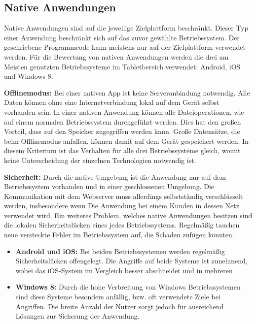 \subsection{Native Anwendungen}
Native Anwendungen sind auf die jeweilige Zielplattform beschränkt. Dieser Typ einer Anwendung beschränkt sich auf das zuvor gewählte Betriebssystem. Der geschriebene Programmcode kann meistens nur auf der Zielplattform verwendet werden. Für die Bewertung von nativen Anwendungen werden die drei am Meisten genutzten Betriebssysteme im Tabletbereich verwendet: Android, iOS und Windows 8\cite{bib:nativeBS}. \par

\textbf{Offlinemodus:} Bei einer nativen App ist keine Serveranbindung notwendig. Alle Daten können ohne eine Internetverbindung lokal auf dem Gerät selbst vorhanden sein. In einer nativen Anwendung können alle Dateioperationen, wie auf einem normalen Betriebssystem durchgeführt werden. Dies hat den großen Vorteil, dass auf den Speicher zugegriffen werden kann. Große Datensätze, die beim Offlinemodus anfallen, können damit auf dem Gerät gespeichert werden.  In diesem Kriterium ist das Verhalten für alle drei Betriebssysteme gleich, womit keine Unterscheidung der einzelnen Technologien notwendig ist.\par

\textbf{Sicherheit:} Durch die native Umgebung ist die Anwendung nur auf dem Betriebssystem vorhanden und in einer geschlossenen Umgebung. Die Kommunikation mit dem Webserver muss allerdings selbstständig verschlüsselt werden, insbesondere wenn Die Anwendung bei einem Kunden in dessen Netz verwendet wird. Ein weiteres Problem, welches native Anwendungen besitzen sind die lokalen Sicherheitslücken eines jedes Betriebssystems. Regelmäßig tauchen neue versteckte Fehler im Betriebssystem auf, die Schaden zufügen könnten. 

\begin{itemize}
        \item \textbf{Android und iOS:} Bei beiden Betriebssystemen werden regelmäßig Sicherheitslücken offengelegt. Die Angriffe auf beide Systeme ist zunehmend, wobei das iOS-System im Vergleich besser abschneidet und in mehreren 
        
        \item \textbf{Windows 8:} Durch die hohe Verbreitung von Windows Betriebssystemen sind diese Systeme besonders anfällig, bzw. oft verwendete Ziele bei Angriffen. Die breite Anzahl der Nutzer sorgt jedoch für ausreichend Lösungen zur Sicherung der Anwendung.
        
       
\end{itemize}

